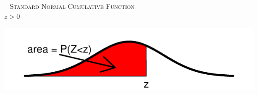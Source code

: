 \documentclass[12pt,letterpaper]{article}
\begin{document}
\newpage

\thispagestyle{empty}


\begin{multicols}{2}
{~}
\vfill
\textsc{Standard Normal Cumulative Function}\\\indent
$z>0$
\vfill
{~}
\columnbreak

\includegraphics[scale=0.9]{zpos.pdf}
\end{multicols}
\vspace{-20pt}
\end{document}
